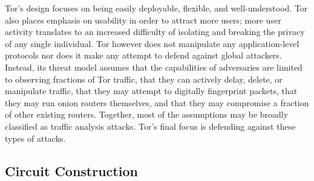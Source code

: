 Tor's design focuses on being easily deployable, flexible, and well-understood. Tor also places emphasis on usability in order to attract more users; more user activity translates to an increased difficulty of isolating and breaking the privacy of any single individual. Tor however does not manipulate any application-level protocols nor does it make any attempt to defend against global attackers. Instead, its threat model assumes that the capabilities of adversaries are limited to observing fractions of Tor traffic, that they can actively delay, delete, or manipulate traffic, that they may attempt to digitally fingerprint packets, that they may run onion routers themselves, and that they may compromise a fraction of other existing routers. Together, most of the assumptions may be broadly classified as traffic analysis attacks. Tor's final focus is defending against these types of attacks.\cite{dingledine2004tor}

\subsection{Circuit Construction}

